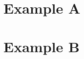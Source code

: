 \begin{appendices}



\chapter{Example A}\label{app:app1}








\chapter{Example B}\label{app:app2}


\end{appendices}